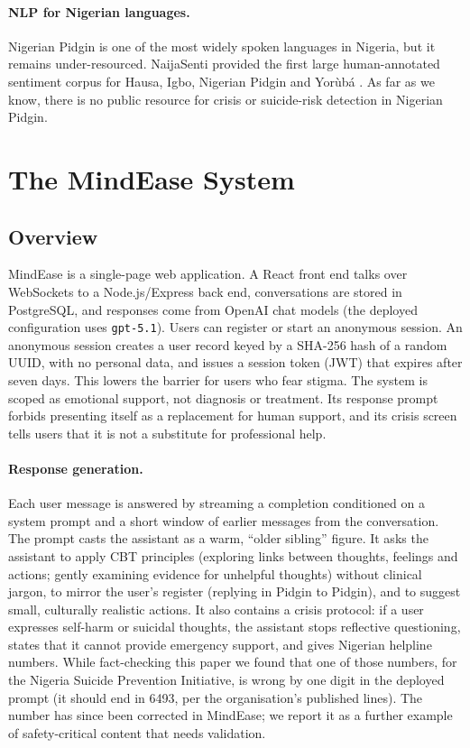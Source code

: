 \paragraph{NLP for Nigerian languages.} Nigerian Pidgin is one of the most widely spoken languages in Nigeria, but it remains under-resourced. NaijaSenti provided the first large human-annotated sentiment corpus for Hausa, Igbo, Nigerian Pidgin and Yor\`ub\'a \citep{muhammad2022naijasenti}. As far as we know, there is no public resource for crisis or suicide-risk detection in Nigerian Pidgin.

\section{The MindEase System}\label{sec:system}

\subsection{Overview}
MindEase is a single-page web application. A React front end talks over WebSockets to a Node.js/Express back end, conversations are stored in PostgreSQL, and responses come from OpenAI chat models (the deployed configuration uses \texttt{gpt-5.1}). Users can register or start an anonymous session. An anonymous session creates a user record keyed by a SHA-256 hash of a random UUID, with no personal data, and issues a session token (JWT) that expires after seven days. This lowers the barrier for users who fear stigma. The system is scoped as emotional support, not diagnosis or treatment. Its response prompt forbids presenting itself as a replacement for human support, and its crisis screen tells users that it is not a substitute for professional help.

\paragraph{Response generation.} Each user message is answered by streaming a completion conditioned on a system prompt and a short window of earlier messages from the conversation. The prompt casts the assistant as a warm, ``older sibling'' figure. It asks the assistant to apply CBT principles (exploring links between thoughts, feelings and actions; gently examining evidence for unhelpful thoughts) without clinical jargon, to mirror the user's register (replying in Pidgin to Pidgin), and to suggest small, culturally realistic actions. It also contains a crisis protocol: if a user expresses self-harm or suicidal thoughts, the assistant stops reflective questioning, states that it cannot provide emergency support, and gives Nigerian helpline numbers. While fact-checking this paper we found that one of those numbers, for the Nigeria Suicide Prevention Initiative, is wrong by one digit in the deployed prompt (it should end in 6493, per the organisation's published lines). The number has since been corrected in MindEase; we report it as a further example of safety-critical content that needs validation.

